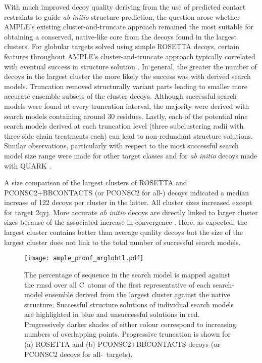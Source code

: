 With much improved decoy quality deriving from the use of predicted contact restraints to guide \textit{ab initio} structure prediction, the question arose whether AMPLE's existing cluster-and-truncate approach remained the most suitable for obtaining a conserved, native-like core from the decoys found in the largest clusters. For globular targets solved using simple ROSETTA decoys, certain features throughout AMPLE's cluster-and-truncate approach typically correlated with eventual success in structure solution \cite{Bibby2012-lm}. In general, the greater the number of decoys in the largest cluster the more likely the success was with derived search models. Truncation removed structurally variant parts leading to smaller more accurate ensemble subsets of the cluster decoys. Although successful search models were found at every truncation interval, the majority were derived with search models containing around 30 residues. Lastly, each of the potential nine search models derived at each truncation level (three subclustering radii with three side chain treatments each) can lead to non-redundant structure solutions. Similar observations, particularly with respect to the most successful search model size range were made for other target classes \cite{Thomas2017-sh, Thomas2015-wu} and for \textit{ab initio} decoys made with QUARK \cite{Keegan2015-zb}.

A size comparison of the largest clusters of ROSETTA and PCONSC2+BBCONTACTS (or PCONSC2 for all-\textalpha) decoys indicated a median increase of 122 decoys per cluster in the latter. All cluster sizes increased except for target 2qyj. More accurate \textit{ab initio} decoys are directly linked to larger cluster sizes because of the associated increase in convergence \cite{Simons1997-oe}. Here, as expected, the largest cluster contains better than average quality decoys but the size of the largest cluster does not link to the total number of successful search models.  

\begin{figure}[H]
    \centering
    \texttt{[image: ample\_proof\_mrglobtl.pdf]}
    \caption[Effect of progressive truncation on RMSD of ensemble centroid]{The percentage of sequence in the search model is mapped against the \gls{rmsd} over all C\textalpha\ atoms of the first representative of each search-model ensemble derived from the largest cluster against the native structure. Successful structure solutions of individual search models are highlighted in blue and unsuccessful solutions in red.  Progressively darker shades of either colour correspond to increasing numbers of overlapping points.  Progressive truncation is shown for (a) ROSETTA and (b) PCONSC2+BBCONTACTS decoys (or PCONSC2 decoys for all-\textalpha\ targets).}
    \label{fig:ample_proof_mrglobtl}
\end{figure}

